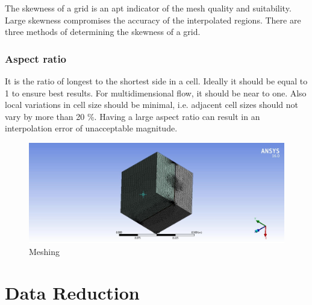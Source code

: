 The skewness of a grid is an apt indicator of the mesh quality and suitability. Large skewness compromises the accuracy of the interpolated regions. There are three methods of determining the skewness of a grid.

\subsubsection{Aspect ratio}

It is the ratio of longest to the shortest side in a cell. Ideally it should be equal to 1 to ensure best results. For multidimensional flow, it should be near to one. Also local variations in cell size should be minimal, i.e. adjacent cell sizes should not vary by more than 20 \%. Having a large aspect ratio can result in an interpolation error of unacceptable magnitude.



\begin{figure}[h]
	\label{ss}    %
	\centering
	\includegraphics[width= 15 cm]{107.jpg}
	\caption{ Meshing}
\end{figure}





\section{Data Reduction}


